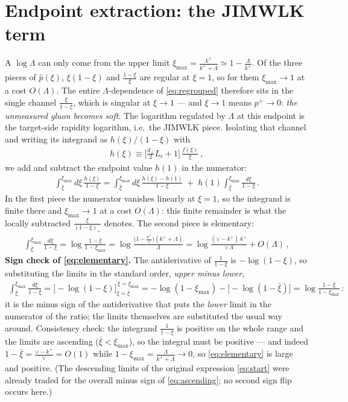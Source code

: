 \documentclass[10pt]{article}
\newcommand{\Leps}{L_{\epsilon}}
\begin{document}
\section{Endpoint extraction: the JIMWLK term}
A $\log\Lambda$ can only come from the upper limit
$\xi_{\max}=\frac{k^{+}}{k^{+}+\Lambda}\simeq1-\frac{\Lambda}{k^{+}}$. Of the three pieces of
$\hat p(\xi)$, $\xi(1-\xi)$ and $\frac{1-\xi}{\xi}$ are regular at $\xi=1$, so for them
$\xi_{\max}\to1$ at a cost $O(\Lambda)$. The entire $\Lambda$-dependence of \eqref{eq:regrouped}
therefore sits in the single channel $\frac{\xi}{1-\xi}$, which is singular at $\xi\to1$ --- and
$\xi\to1$ means $p^{+}\to0$: \emph{the unmeasured gluon becomes soft}. The logarithm regulated by
$\Lambda$ at this endpoint is the target-side rapidity logarithm, i.e.\ the JIMWLK piece.
Isolating that channel and writing its integrand as $h(\xi)/(1-\xi)$ with
\begin{align}
h(\xi)\equiv\Big[\frac{d_{\perp}}{2}\Leps+1\Big]\,\frac{f(\xi)}{\xi}\,,
\end{align}
we add and subtract the endpoint value $h(1)$ in the numerator:
\begin{align}\label{eq:addsub}
\int_{\bar\xi}^{\xi_{\max}}\!\!d\xi\,\frac{h(\xi)}{1-\xi}
=\int_{\bar\xi}^{\xi_{\max}}\!\!d\xi\,\frac{h(\xi)-h(1)}{1-\xi}
\;+\;h(1)\int_{\bar\xi}^{\xi_{\max}}\frac{d\xi}{1-\xi}\,.
\end{align}
In the first piece the numerator vanishes linearly at $\xi=1$, so the integrand is finite there
and $\xi_{\max}\to1$ at a cost $O(\Lambda)$: this finite remainder is what the locally subtracted
$\frac{\xi}{(1-\xi)_{+}}$ denotes. The second piece is elementary:
\begin{align}\label{eq:elementary}
\int_{\bar\xi}^{\xi_{\max}}\frac{d\xi}{1-\xi}
=\log\frac{1-\bar\xi}{1-\xi_{\max}}
=\log\frac{\big(1-\frac{k^{+}}{\vee}\big)(k^{+}+\Lambda)}{\Lambda}
=\log\frac{(\vee-k^{+})\,k^{+}}{\vee\,\Lambda}+O(\Lambda)\,,
\end{align}
\textbf{Sign check of \eqref{eq:elementary}.} The antiderivative of $\frac{1}{1-\xi}$ is
$-\log(1-\xi)$, so substituting the limits in the standard order, \emph{upper minus lower},
\begin{align*}
\int_{\bar\xi}^{\xi_{\max}}\frac{d\xi}{1-\xi}
=\Big[-\log(1-\xi)\Big]_{\xi=\bar\xi}^{\,\xi=\xi_{\max}}
=-\log(1-\xi_{\max})-\big[-\log(1-\bar\xi)\big]
=\log\frac{1-\bar\xi}{1-\xi_{\max}}\,:
\end{align*}
it is the minus sign of the antiderivative that puts the \emph{lower} limit in the numerator of
the ratio; the limits themselves are substituted the usual way around. Consistency check: the
integrand $\frac{1}{1-\xi}$ is positive on the whole range and the limits are ascending
($\bar\xi<\xi_{\max}$), so the integral must be positive --- and indeed
$1-\bar\xi=\frac{\vee-k^{+}}{\vee}=O(1)$ while $1-\xi_{\max}=\frac{\Lambda}{k^{+}+\Lambda}\to0$,
so \eqref{eq:elementary} is large and positive. (The descending limits of the original expression
\eqref{eq:start} were already traded for the overall minus sign of \eqref{eq:ascending}; no second
sign flip occurs here.)
\end{document}
